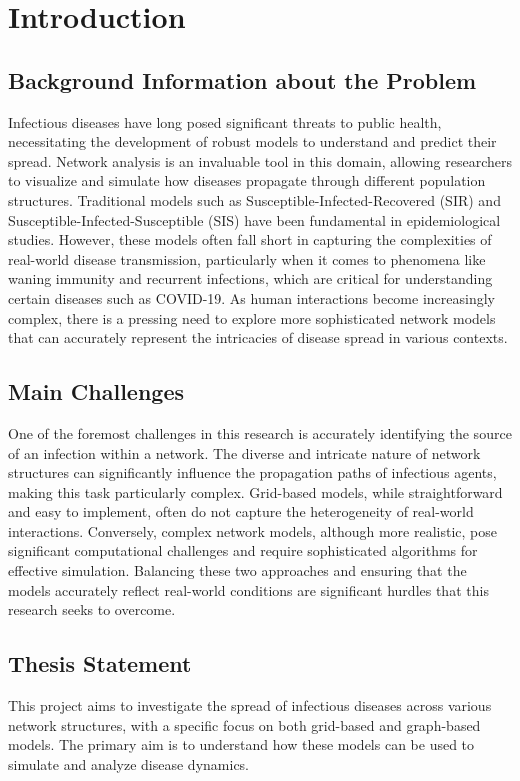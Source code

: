 \chapter{Introduction}
\section{Background Information about the Problem}
Infectious diseases have long posed significant threats to public health, necessitating the development of robust models to understand and predict their spread. Network analysis is an invaluable tool in this domain, allowing researchers to visualize and simulate how diseases propagate through different population structures. Traditional models such as Susceptible-Infected-Recovered (SIR) and Susceptible-Infected-Susceptible (SIS) have been fundamental in epidemiological studies. However, these models often fall short in capturing the complexities of real-world disease transmission, particularly when it comes to phenomena like waning immunity and recurrent infections, which are critical for understanding certain diseases such as COVID-19. As human interactions become increasingly complex, there is a pressing need to explore more sophisticated network models that can accurately represent the intricacies of disease spread in various contexts.

\section{Main Challenges}
One of the foremost challenges in this research is accurately identifying the source of an infection within a network. The diverse and intricate nature of network structures can significantly influence the propagation paths of infectious agents, making this task particularly complex. Grid-based models, while straightforward and easy to implement, often do not capture the heterogeneity of real-world interactions. Conversely, complex network models, although more realistic, pose significant computational challenges and require sophisticated algorithms for effective simulation. Balancing these two approaches and ensuring that the models accurately reflect real-world conditions are significant hurdles that this research seeks to overcome.

\section{Thesis Statement}
This project aims to investigate the spread of infectious diseases across various network structures, with a specific focus on both grid-based and graph-based models. The primary aim is to understand how these models can be used to simulate and analyze disease dynamics.

